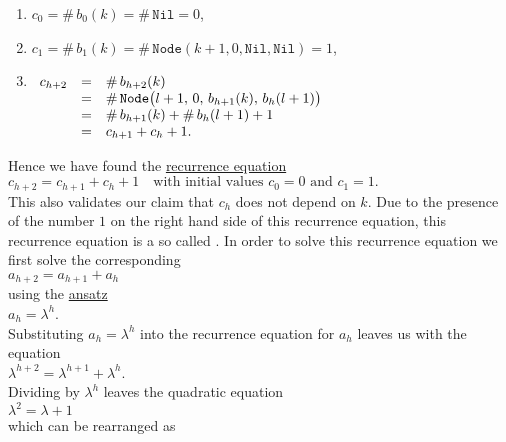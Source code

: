 \begin{enumerate}
\item $c_0 = \#\, b_0(k) = \#\, \texttt{Nil} = 0$,
\item $c_1 = \#\, b_1(k) = \#\, \texttt{Node}(k+1,0,\texttt{Nil}, \texttt{Nil}) = 1$, 
\item$\begin{array}[t]{lcl}
       c_{h+2} & = & \#\, b_{h+2}(k) \\
               & = & \#\,\texttt{Node}\bigl(l+1,\,0,\,b_{h+1}(k),\,b_h(l+1)\bigr) \\
               & = & \#\, b_{h+1}(k) + \#\, b_h(l+1) + 1 \\
               & = & c_{h+1} + c_h + 1.
       \end{array}$
\end{enumerate}
Hence we have found the \href{https://en.wikipedia.org/wiki/Recurrence_relation}{recurrence equation}
\\[0.2cm]
\hspace*{1.3cm}
$c_{h+2} = c_{h+1} + c_h + 1 \quad \mbox{with initial values $c_0 = 0$ and $c_1 = 1$}.$
\\[0.2cm]
This also validates our claim that $c_h$ does not depend on $k$.  Due to the presence of the number $1$ on the
right hand side of this recurrence equation, this recurrence equation is a so called 
.  In order to solve this recurrence
equation we first solve the corresponding  
\\[0.2cm]
\hspace*{1.3cm}
$a_{h+2} = a_{h+1} + a_h$
\\[0.2cm]
using the \href{https://en.wikipedia.org/wiki/Ansatz}{ansatz}
\\[0.2cm]
\hspace*{1.3cm}
$a_h = \lambda^h$.
\\[0.2cm]
Substituting $a_h = \lambda^h$ into the recurrence equation for $a_h$ leaves us with the equation
\\[0.2cm]
\hspace*{1.3cm}
$\lambda^{h+2} = \lambda^{h+1} + \lambda^{h}$.
\\[0.2cm]
Dividing by $\lambda^h$ leaves the quadratic equation
\\[0.2cm]
\hspace*{1.3cm}
$\lambda^2 = \lambda + 1$
\\[0.2cm]
which can be rearranged as
\\[0.2cm]
\hspace*{1.3cm}
